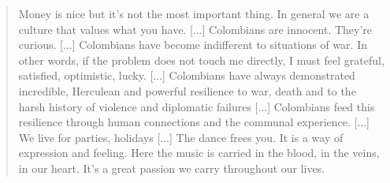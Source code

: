 \documentclass[10pt, letterpaper]{article}
\begin{document}
\begin{spacing}{2}
\begin{quote}
  Money is nice but it's not the most important thing. In general we are a
  culture that values what you have. [...] %
  Colombians are innocent. They're curious. [...] %
  Colombians have become indifferent to situations of war. In other words, if
  the problem does not touch me directly, I must feel grateful, satisfied,
  optimistic, lucky. [...] Colombians have always demonstrated incredible,
  Herculean and powerful resilience to war, death and to the harsh history of
  violence and diplomatic failures [...] Colombians feed this resilience through
  human connections and the communal
  experience. [...] %
  We live for parties, holidays %
  [...] The dance frees
  you. It is a way of expression and feeling. Here the music is carried in the
  blood, in the veins, in our heart. It's a great passion we carry throughout
  our lives.%
\end{quote} 
  




\end{spacing}
\end{document}
